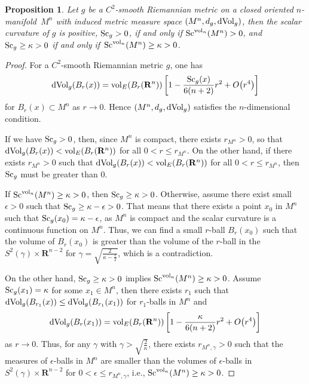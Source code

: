 \documentclass[pdftex]{sigma}
\newtheorem{Proposition}[Theorem]{Proposition}
\begin{document}
\begin{Proposition}Let $g$ be a $C^2$-smooth Riemannian metric on a closed oriented $n$-mani\-fold~$M^n$ with induced metric measure space $(M^n, d_g, {\rm dVol}_g)$, then the scalar curvature of $g$ is positive, ${\rm Sc}_g> 0$, if and only if ${\rm Sc}^{{\rm vol}_n}(M^n)>0 $, and ${\rm Sc}_g\geq\kappa> 0$ if and only if~${\rm Sc}^{{\rm vol}_n}(M^n)\geq\kappa> 0$.
\end{Proposition}

\begin{proof}For a $C^2$-smooth Riemannian metric $g$, one has
\begin{gather*}
{\rm dVol}_g(B_r(x)) = {\rm vol}_E(B_r(\mathbf{R}^n))\left[1 - \frac{{\rm Sc}_g(x)}{6(n+2)} r^2 + O\big(r^4\big)\right]
 \end{gather*}
for $B_r(x) \subset M^n$ as $r\to 0$. Hence $(M^n, d_g, {\rm dVol}_g)$ satisfies the $n$-dimensional condition.

If we have ${\rm Sc}_g > 0$, then, since $M^n$ is compact, there exists $r_{M^n} > 0$, so that ${\rm dVol}_g(B_r(x))< {\rm vol}_E(B_r(\mathbf{R}^n))$ for all $0<r \leq r_{M^n}$. On the other hand, if there exists $r_{M^n} > 0$ such that ${\rm dVol}_g(B_r(x))< {\rm vol}_E(B_r(\mathbf{R}^n))$ for all $0<r \leq r_{M^n}$, then ${\rm Sc}_g$ must be greater than 0.

If ${\rm Sc}^{{\rm vol}_n}(M^n)\geq\kappa> 0$, then ${\rm Sc}_g \geq \kappa > 0$. Otherwise, assume there exist small $\epsilon>0$ such that ${\rm Sc}_g \geq \kappa-\epsilon>0$. That means that there exists a point $x_0$ in $M^n$ such that ${\rm Sc}_g(x_0)= \kappa-\epsilon$, as $M^n$ is compact and the scalar curvature is a continuous function on $M^n$. Thus, we can find a small $r$-ball $B_r(x_0)$ such that the volume of $B_r(x_0)$ is greater than the volume of the $r$-ball in the $S^2(\gamma)\times \mathbf{R}^{n-2}$ for $\gamma=\sqrt{\frac{2}{\kappa-\frac{\epsilon}{2}}}$, which is a contradiction.

On the other hand, ${\rm Sc}_g\geq\kappa> 0$ implies ${\rm Sc}^{{\rm vol}_n}(M^n)\geq\kappa> 0$. Assume ${\rm Sc}_g(x_1)=\kappa$ for some $x_1\in M^n$, then there exists $r_1$ such that ${\rm dVol}_g(B_{r_1}(x))\leq {\rm dVol}_g(B_{r_1}(x_1))$ for $r_1$-balls in $M^n$ and
\begin{gather*}
 {\rm dVol}_g(B_r(x_1)) = {\rm vol}_E(B_r(\mathbf{R}^n))\left[1 - \frac{\kappa}{6(n+2)} r^2 + O\big(r^4\big)\right]
\end{gather*}
 as $r\to 0$. Thus, for any $\gamma$ with $\gamma> \sqrt{\frac{2}{\kappa}}$, there exists $r_{M^n,\gamma} >0$ such that the measures of $\epsilon$-balls in $M^n$ are smaller than the volumes of $\epsilon$-balls in $S^2(\gamma)\times \mathbf{R}^{n-2}$ for $0 < \epsilon \leq r_{M^n,\gamma}$, i.e., ${\rm Sc}^{{\rm vol}_n}(M^n)\geq\kappa> 0$.
\end{proof}
\end{document}

